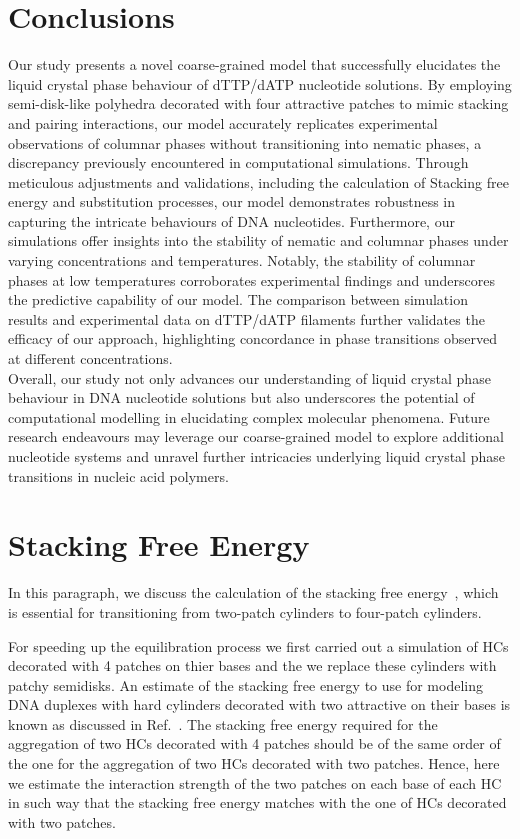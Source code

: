 \documentclass[aip,jcp, amsmath, amssymb, reprint]{revtex4-1}
\begin{document}
\section{\label{Dis}Conclusions}
Our study presents a novel coarse-grained model that successfully elucidates the liquid crystal phase behaviour of
dTTP/dATP nucleotide solutions. By employing semi-disk-like polyhedra decorated with four attractive patches to mimic
stacking and pairing interactions, our model accurately replicates experimental observations of columnar phases without
transitioning into nematic phases, a discrepancy previously encountered in computational simulations. Through
meticulous adjustments and validations, including the calculation of Stacking free energy and substitution processes,
our model demonstrates robustness in capturing the intricate behaviours of DNA nucleotides. Furthermore, our
simulations offer insights into the stability of nematic and columnar phases under varying concentrations and
temperatures. Notably, the stability of columnar phases at low temperatures corroborates experimental findings and
underscores the predictive capability of our model. The comparison between simulation results and experimental data on
dTTP/dATP filaments further validates the efficacy of our approach, highlighting concordance in phase transitions
observed at different concentrations. \\

Overall, our study not only advances our understanding of liquid crystal phase behaviour in DNA nucleotide solutions
but also underscores the potential of computational modelling in elucidating complex molecular phenomena. Future
research endeavours may leverage our coarse-grained model to explore additional nucleotide systems and unravel further
intricacies underlying liquid crystal phase transitions in nucleic acid polymers.
\appendix

\section{Stacking Free Energy}\label{app:freeenergy}

In this paragraph, we discuss the calculation of the stacking free energy~\cite{DeMichele12}, which is essential for
transitioning from two-patch cylinders to four-patch cylinders. 

For speeding up the equilibration process we first carried out a simulation of HCs decorated with 4 patches on thier
bases and the we replace these cylinders with patchy semidisks. An estimate of the stacking free energy to use for
modeling DNA duplexes with hard cylinders  decorated with two attractive on their bases is known as discussed in
Ref.~\cite{DeMichele12}. The stacking free energy required for the aggregation of two HCs decorated with 4 patches
should be of the same order of the one for the aggregation of two HCs decorated with two patches. Hence, here we
estimate the interaction strength of the two patches on each base of each HC in such way that the stacking free energy
matches with the one of HCs decorated with two patches.
\end{document}
